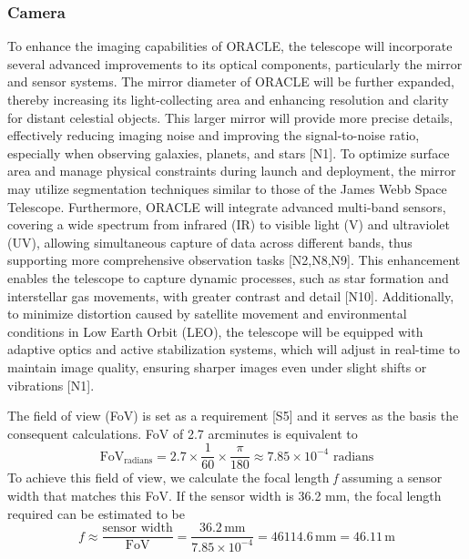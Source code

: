 \subsubsection{Camera}
To enhance the imaging capabilities of ORACLE, the telescope will incorporate several advanced improvements to its optical components, particularly the mirror and sensor systems. The mirror diameter of ORACLE will be further expanded, thereby increasing its light-collecting area and enhancing resolution and clarity for distant celestial objects. This larger mirror will provide more precise details, effectively reducing imaging noise and improving the signal-to-noise ratio, especially when observing galaxies, planets, and stars [N1]. To optimize surface area and manage physical constraints during launch and deployment, the mirror may utilize segmentation techniques similar to those of the James Webb Space Telescope. Furthermore, ORACLE will integrate advanced multi-band sensors, covering a wide spectrum from infrared (IR) to visible light (V) and ultraviolet (UV), allowing simultaneous capture of data across different bands, thus supporting more comprehensive observation tasks [N2,N8,N9]. This enhancement enables the telescope to capture dynamic processes, such as star formation and interstellar gas movements, with greater contrast and detail [N10]. Additionally, to minimize distortion caused by satellite movement and environmental conditions in Low Earth Orbit (LEO), the telescope will be equipped with adaptive optics and active stabilization systems, which will adjust in real-time to maintain image quality, ensuring sharper images even under slight shifts or vibrations [N1].
\vspace{1.5mm}

The field of view (FoV) is set as a requirement [S5] and it serves as the basis the consequent calculations. FoV of 2.7 arcminutes is equivalent to 
\begin{equation}
\text{FoV}_{\text{radians}} = 2.7 \times \frac{1}{60} \times \frac{\pi}{180} \approx 7.85 \times 10^{-4} \text{ radians}
\end{equation}
To achieve this field of view, we calculate the focal length \textit{f} assuming a sensor width that matches this FoV. If the sensor width is 36.2 mm, the focal length required can be estimated to be
\begin{equation}
f \approx \frac{\text{sensor width}}{\text{FoV}} = \frac{36.2 \, \text{mm}}{7.85 \times 10^{-4}} = 46114.6\, \text{mm} = 46.11 \, \text{m}
\end{equation}


